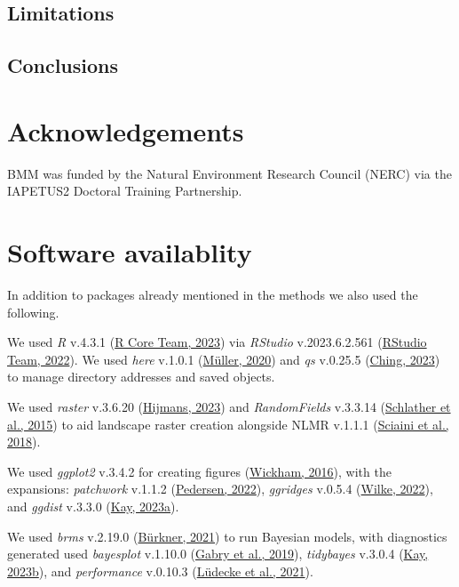 \documentclass[10pt,a4paper]{article}
\begin{document}
\hypertarget{limitations}{%
\subsection{Limitations}\label{limitations}}

\hypertarget{conclusions}{%
\subsection{Conclusions}\label{conclusions}}

\hypertarget{acknowledgements}{%
\section{Acknowledgements}\label{acknowledgements}}

BMM was funded by the Natural Environment Research Council (NERC) via the IAPETUS2 Doctoral Training Partnership.

\hypertarget{software-availablity}{%
\section{Software availablity}\label{software-availablity}}

In addition to packages already mentioned in the methods we also used the following.

We used \emph{R} v.4.3.1 (\protect\hyperlink{ref-base}{R Core Team, 2023}) via \emph{RStudio} v.2023.6.2.561 (\protect\hyperlink{ref-rstudio}{RStudio Team, 2022}).
We used \emph{here} v.1.0.1 (\protect\hyperlink{ref-here}{Müller, 2020}) and \emph{qs} v.0.25.5 (\protect\hyperlink{ref-qs}{Ching, 2023}) to manage directory addresses and saved objects.

We used \emph{raster} v.3.6.20 (\protect\hyperlink{ref-raster}{Hijmans, 2023}) and \emph{RandomFields} v.3.3.14 (\protect\hyperlink{ref-RandomFields}{Schlather et al., 2015}) to aid landscape raster creation alongside NLMR v.1.1.1 (\protect\hyperlink{ref-NLMR}{Sciaini et al., 2018}).

We used \emph{ggplot2} v.3.4.2 for creating figures (\protect\hyperlink{ref-ggplot2}{Wickham, 2016}), with the expansions: \emph{patchwork} v.1.1.2 (\protect\hyperlink{ref-patchwork}{Pedersen, 2022}), \emph{ggridges} v.0.5.4 (\protect\hyperlink{ref-ggridges}{Wilke, 2022}), and \emph{ggdist} v.3.3.0 (\protect\hyperlink{ref-ggdist}{Kay, 2023a}).

We used \emph{brms} v.2.19.0 (\protect\hyperlink{ref-brms}{Bürkner, 2021}) to run Bayesian models, with diagnostics generated used \emph{bayesplot} v.1.10.0 (\protect\hyperlink{ref-bayesplot}{Gabry et al., 2019}), \emph{tidybayes} v.3.0.4 (\protect\hyperlink{ref-tidybayes}{Kay, 2023b}), and \emph{performance} v.0.10.3 (\protect\hyperlink{ref-performance}{Lüdecke et al., 2021}).
\end{document}
